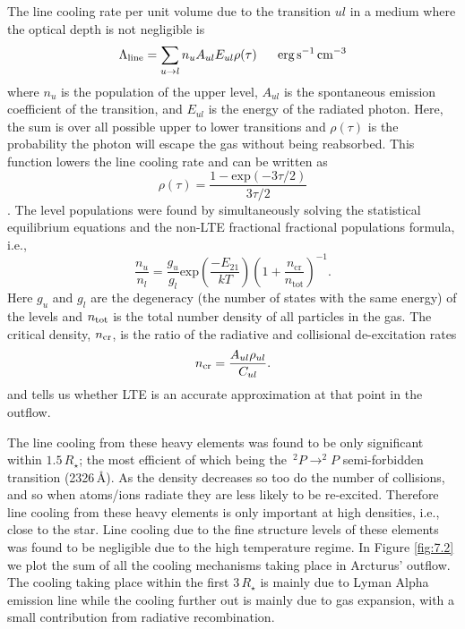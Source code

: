 The line cooling rate per unit volume due to the transition $ul$ in a medium where the optical depth is not negligible is 
\begin{equation}
\Lambda _{\rm{line}} =\sum_{u\rightarrow l} n_{u}A_{ul}E_{ul}\rho (\tau) \ \ \ \ \ \rm{erg}\,\rm{s^{-1}\,cm^{-3}}
\end{equation}
where $n_{u}$ is the population of the upper level, $A_{ul}$ is the spontaneous emission coefficient of the transition, and $E_{ul}$ is the energy of the radiated photon. Here, the sum is over all possible upper to lower transitions and $\rho (\tau)$ is the probability the photon will escape the gas without being reabsorbed. This function lowers the line cooling rate and can be written as 
\begin{equation}
\rho (\tau) = \frac{1-\mathrm{exp}(-3\tau /2)}{3\tau /2}
\end{equation}
\citep{castor_2004}. The level populations were found by simultaneously solving the statistical equilibrium equations and the non-LTE fractional fractional populations formula, i.e.,
\begin{equation}
\frac{n_u}{n_l}=\frac{g_u}{g_l}\mathrm{exp} \left( \frac{-E_{21}}{kT}\right)\left( 1+\frac{n_{\mathrm{cr}}}{n_{\mathrm{tot}}} \right)^{-1}.
\end{equation}
Here $g_{u}$ and $g_{l}$ are the degeneracy (the number of states with the same energy) of the levels and $n_{\rm{tot}}$ is the total number density of all particles in the gas. The critical density, $n_{\rm{cr}}$, is the ratio of the radiative and collisional de-excitation rates
\begin{equation}
n_{\rm{cr}}=\frac{A_{ul}\rho _{ul}}{C_{ul}}.
\end{equation}
and tells us whether LTE is an accurate approximation at that point in the outflow.

The line cooling from these heavy elements was found to be only significant within $1.5\,R_{\star}$; the most efficient of which being the \,$^{2}P \rightarrow ^{2}P$ semi-forbidden transition (2326\,\AA). As the density decreases so too do the number of collisions, and so when atoms/ions radiate they are less likely to be re-excited. Therefore line cooling from these heavy elements is only important at high densities, i.e., close to the star. Line cooling due to the fine structure levels of these elements was found to be negligible due to the high temperature regime. In Figure \ref{fig:7.2} we plot the sum of all the cooling mechanisms taking place in Arcturus' outflow. The cooling taking place within the first $3\,R_{\star}$ is mainly due to Lyman Alpha emission line while the cooling further out is mainly due to gas expansion, with a small contribution from radiative recombination. 

